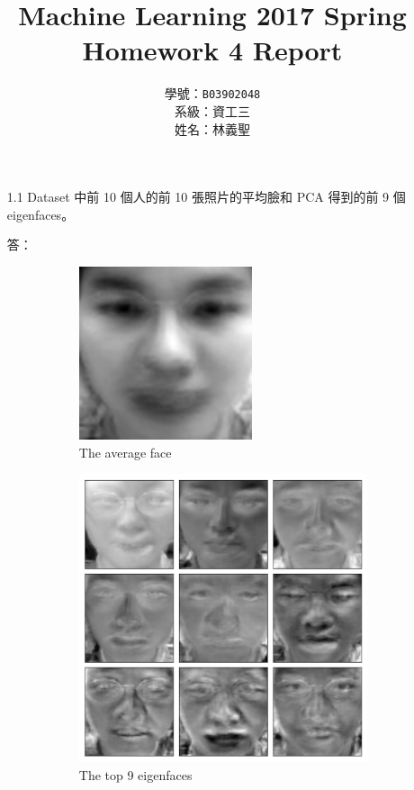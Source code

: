 \documentclass[12pt,a4paper]{extarticle}
\title{Machine Learning 2017 Spring\\Homework 4 Report}
\author{學號：\texttt{B03902048}\\系級：資工三\\姓名：林義聖}
\date{}
\begin{document}
\maketitle

\begin{itemize}

  \item[1.1] Dataset 中前 10 個人的前 10 張照片的平均臉和 PCA 得到的前 9 個 eigenfaces。
  \par 答：

  \begin{figure}[H]
    \begin{subfigure}[t]{0.5\textwidth}
      \centering
      \includegraphics[width=0.8\linewidth]{average-face.png}
      \caption{The average face}
      \label{fig:average-face}
    \end{subfigure}
    \begin{subfigure}[t]{0.5\textwidth}
      \centering
      \includegraphics[width=0.8\linewidth]{eigen-faces-top-9.png}
      \caption{The top 9 eigenfaces}
      \label{fig:top-9-eigenfaces}
    \end{subfigure}
    \caption{}
  \end{figure}


\end{itemize}
\end{document}
